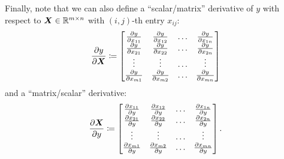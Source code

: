 Finally, note that we can also define a ``scalar/matrix'' derivative of \(y\) with respect to \(\boldsymbol{X} \in \mathbb{R}^{m \times n}\) with \((i, j)\)-th entry \(x_{ij}\):
\begin{equation*}
	\frac{\partial y}{\partial \boldsymbol{X}} \coloneqq
	\begin{bmatrix}
		\frac{\partial y}{\partial x_{11}} & \frac{\partial y}{\partial x_{12}} & \dots & \frac{\partial y}{\partial x_{1n}} \\
		\frac{\partial y}{\partial x_{21}} & \frac{\partial y}{\partial x_{22}} & \dots & \frac{\partial y}{\partial x_{2n}} \\
		\vdots                             & \vdots                             & \dots & \vdots                             \\
		\frac{\partial y}{\partial x_{m1}} & \frac{\partial y}{\partial x_{m2}} & \dots & \frac{\partial y}{\partial x_{mn}}
	\end{bmatrix}
\end{equation*}
and a ``matrix/scalar'' derivative:
\begin{equation*}
	\frac{\partial \boldsymbol{X}}{\partial y} \coloneqq
	\begin{bmatrix}
		\frac{\partial x_{11}}{\partial y} & \frac{\partial x_{12}}{\partial y} & \dots & \frac{\partial x_{1n}}{\partial y} \\
		\frac{\partial x_{21}}{\partial y} & \frac{\partial x_{22}}{\partial y} & \dots & \frac{\partial x_{2n}}{\partial y} \\
		\vdots                             & \vdots                             & \dots & \vdots                             \\
		\frac{\partial x_{m1}}{\partial y} & \frac{\partial x_{m2}}{\partial y} & \dots & \frac{\partial x_{mn}}{\partial y}
	\end{bmatrix}.
\end{equation*}

